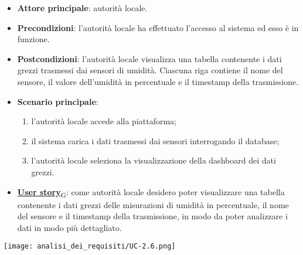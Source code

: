 \begin{itemize}
	\item \textbf{Attore principale}: autorità locale.
	\item \textbf{Precondizioni}: l'autorità locale ha effettuato l'accesso al sistema ed esso è in funzione.
	\item \textbf{Postcondizioni}: l'autorità locale visualizza una tabella contenente i dati grezzi trasmessi dai sensori di umidità.
	      Ciascuna riga contiene il nome del sensore, il valore dell'umidità in percentuale e il timestamp della trasmissione.
	\item \textbf{Scenario principale}:
	      \begin{enumerate}
		      \item l'autorità locale accede alla piattaforma;
		      \item il sistema carica i dati trasmessi dai sensori interrogando il database;
		      \item l'autorità locale seleziona la visualizzazione della dashboard dei dati grezzi.
	      \end{enumerate}
	\item \href{https://7last.github.io/docs/pb/documentazione-interna/glossario\#user-story}{\textbf{User story}\textsubscript{G}}:
	      come autorità locale desidero poter visualizzare una tabella contenente i dati grezzi delle misurazioni di umidità in percentuale,
	      il nome del sensore e il timestamp della trasmissione, in modo da poter analizzare i dati in modo più dettagliato.
\end{itemize}
\begin{center}
	\texttt{[image: analisi\_dei\_requisiti/UC-2.6.png]}
\end{center}

